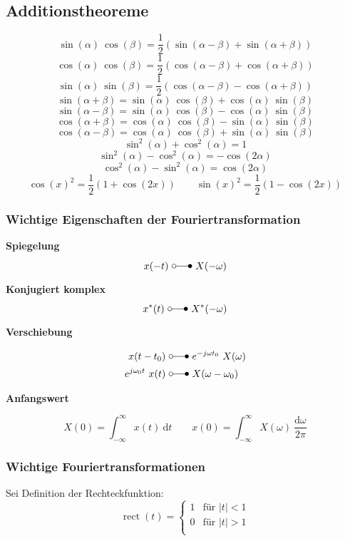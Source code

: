 \documentclass[a4paper, 11pt]{article}
\newcommand{\fancyformula}[2]{
        \small
        \raggedright{\sffamily\textbf{#1}}
        #2
}
\newcommand{\ftransform}{~\laplace~}
\DeclareMathOperator{\rect}{rect}
\begin{document}
\subsection*{Additionstheoreme}
\[ \sin(\alpha) ~ \cos(\beta) = \frac{1}{2} (\sin(\alpha - \beta) + \sin(\alpha + \beta)) \]
\[ \cos(\alpha) ~ \cos(\beta) = \frac{1}{2} (\cos(\alpha - \beta) + \cos(\alpha + \beta)) \]
\[ \sin(\alpha) ~ \sin(\beta) = \frac{1}{2} (\cos(\alpha - \beta) - \cos(\alpha + \beta)) \]
\vspace{0.5pt}
\[ \sin(\alpha + \beta) = \sin(\alpha) ~ \cos(\beta) + \cos(\alpha) ~ \sin(\beta) \]
\[ \sin(\alpha - \beta) = \sin(\alpha) ~ \cos(\beta) - \cos(\alpha) ~ \sin(\beta) \]
\[ \cos(\alpha + \beta) = \cos(\alpha) ~ \cos(\beta) - \sin(\alpha) ~ \sin(\beta) \]
\[ \cos(\alpha - \beta) = \cos(\alpha) ~ \cos(\beta) + \sin(\alpha) ~ \sin(\beta) \]
\vspace{0.5pt}
\[ \sin^2(\alpha) + \cos^2(\alpha) = 1 \]
\[ \sin^2(\alpha) - \cos^2(\alpha) = -\cos(2\alpha) \]
\[ \cos^2(\alpha) - \sin^2(\alpha) = \cos(2\alpha) \]
\[ \cos(x)^2 = \frac{1}{2} \left(1 + \cos(2x) \right) \qquad \sin(x)^2 = \frac{1}{2} \left(1 - \cos(2x) \right) \]

\subsubsection*{Wichtige Eigenschaften der Fouriertransformation}
\begin{multicols}{2}
	\fancyformula{Spiegelung}{\[ x(-t) \ftransform X(-\omega) \]}
	\fancyformula{Konjugiert komplex}{\[ x^*(t) \ftransform X^*(-\omega)\]}
	\fancyformula{Verschiebung}{
		\begin{align*}
			x(t - t_0) & \ftransform e^{-j \omega t_0} ~ X(\omega) \\
			e^{j \omega_0 t} ~ x(t) & \ftransform X(\omega - \omega_0)
		\end{align*}
	}	
	\fancyformula{Anfangswert}{
		\[ X(0) = \int_{-\infty}^{\infty} x(t) ~ \mathrm dt \qquad x(0) = \int_{-\infty}^{\infty} X(\omega) ~ \frac{\mathrm d\omega}{2 \pi} \]	
	}
\end{multicols}


\subsubsection*{Wichtige Fouriertransformationen}
Sei Definition der Rechteckfunktion:
\[
	\rect(t) = \begin{cases}
		1 & \text{für } |t| < 1\\
		0 & \text{für } |t| > 1\\
	\end{cases}
\]
\end{document}

